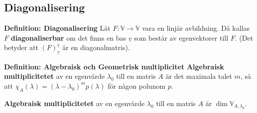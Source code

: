 \begin{multicols}{2}
\section{Diagonalisering}
\textbf{Definition: Diagonalisering}
Låt $F:\mathbb{V}\to\mathbb{V}$ vara en linjär avbildning. Då kallas $F$
\textbf{diagonaliserbar} om det finns en bas $\underline{v}$ som består av
egenvektorer till $F$. 
(Det betyder att ${(F)}^{\underline{v}}_{\underline{v}}$ är en diagonalmatris).

\textbf{Definition: Algebraisk och Geometrisk multiplicitet}
\textbf{Algebraisk multiplicitetet} av en egenvärde $\lambda_0$ till en
matris $A$ är det maximala talet $m$, så att
$\chi_A(\lambda) = {(\lambda-\lambda_0)}^m p(\lambda)$ för någon polunom $p$.

\textbf{Algebraisk multiplicitetet} av en egenvärde $\lambda_0$ till en
matris $A$ är $\dim{\mathbb{V}_{A,\lambda_0}}$.


\end{multicols}
